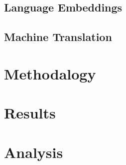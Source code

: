 \documentclass[thesis,fonts=libertine]{cluu}
\begin{document}
\section{Language Embeddings}

\section{Machine Translation}

\chapter{Methodalogy}
\label{chap:method}

\chapter{Results}
\label{chap:results}

\chapter{Analysis}
\label{chap:analysis}

\printbibliography
\end{document}
